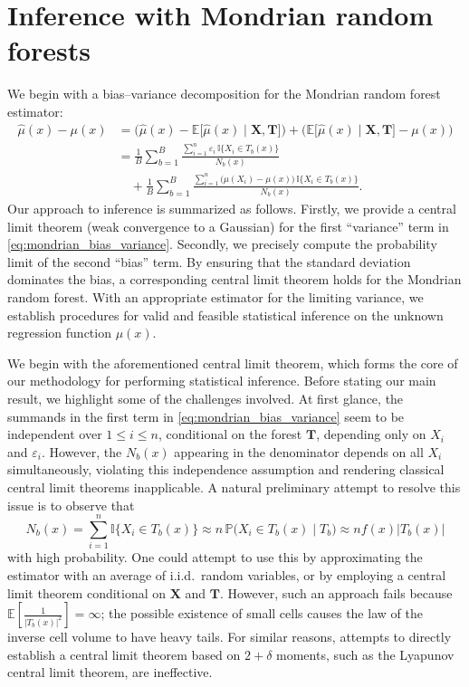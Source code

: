 \documentclass[11pt,lof]{puthesis}
\renewcommand{\P}{\ensuremath{\mathbb{P}}}
\newcommand{\E}{\ensuremath{\mathbb{E}}}
\newcommand{\I}{\ensuremath{\mathbb{I}}}
\newcommand{\bX}{\ensuremath{\mathbf{X}}}
\newcommand{\bT}{\ensuremath{\mathbf{T}}}
\theoremstyle{break}
\theoremstyle{proof}
\begin{document}
\section{Inference with Mondrian random forests}%
\label{sec:mondrian_inference}

We begin with a bias--variance decomposition for the Mondrian random
forest estimator:
%
\begin{align}
\nonumber
\hat\mu(x) - \mu(x)
&=
\Big( \hat\mu(x) - \E \big[ \hat \mu(x) \mid \bX, \bT \big]\Big)
+ \Big( \E \big[ \hat \mu(x) \mid \bX, \bT \big] - \mu(x)\Big) \\
&=
\nonumber
\frac{1}{B} \sum_{b=1}^B
\frac{\sum_{i=1}^n \varepsilon_i \, \I\big\{ X_i \in T_b(x) \big\}}
{N_b(x)} \\
\label{eq:mondrian_bias_variance}
&\quad+
\frac{1}{B} \sum_{b=1}^B
\frac{\sum_{i=1}^n \big(\mu(X_i) - \mu(x)\big) \,
\I\big\{ X_i \in T_b(x) \big\}} {N_b(x)}.
\end{align}
%
Our approach to inference is summarized as follows. Firstly, we provide a
central limit theorem (weak convergence to a Gaussian) for the first
``variance'' term in \eqref{eq:mondrian_bias_variance}. Secondly, we precisely
compute
the probability limit of the second ``bias'' term. By ensuring that the
standard deviation dominates the bias, a corresponding
central limit theorem holds for the Mondrian random forest. With an appropriate
estimator for the limiting variance, we establish procedures for valid and
feasible statistical inference on the unknown regression function $\mu(x)$.

We begin with the aforementioned central limit theorem, which forms the core of
our methodology for performing statistical inference. Before stating our main
result, we highlight some of the challenges involved. At first glance, the
summands in the first term in \eqref{eq:mondrian_bias_variance} seem to be
independent
over $1 \leq i \leq n$, conditional on the forest $\bT$, depending only on
$X_i$ and $\varepsilon_i$. However, the $N_b(x)$ appearing in the denominator
depends on all $X_i$ simultaneously, violating this independence assumption and
rendering classical central limit theorems inapplicable. A natural preliminary
attempt to resolve this issue is to observe that
%
\begin{equation*}
N_b(x)= \sum_{i=1}^{n} \I\big\{X_i \in T_b(x)\big\}
\approx n \, \P \big( X_i \in T_b(x) \mid T_b \big)
\approx n f(x) |T_b(x)|
\end{equation*}
%
with high probability. One could attempt to use this by approximating the
estimator with an average of i.i.d.\ random variables, or by employing a
central limit theorem conditional on $\bX$ and $\bT$. However, such an approach
fails because $\E \left[ \frac{1}{|T_b(x)|^2} \right] = \infty$; the possible
existence of small cells causes the law of the inverse cell volume to have
heavy tails. For similar reasons, attempts to directly establish a central
limit theorem based on $2 + \delta$ moments, such as the Lyapunov central limit
theorem, are ineffective.
\end{document}
